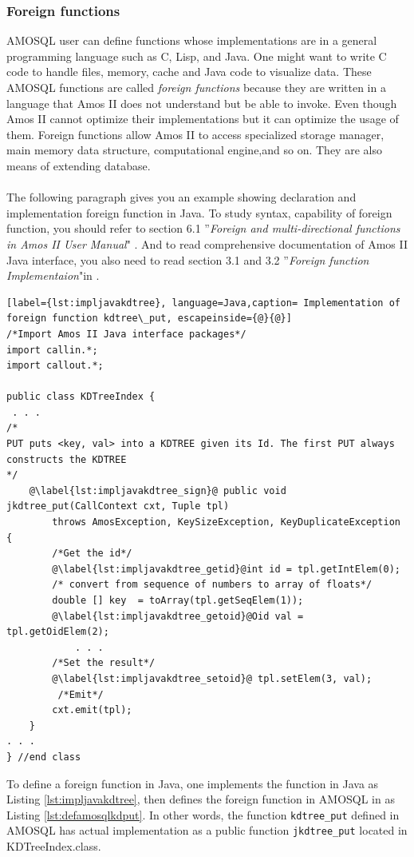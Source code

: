 \documentclass[12pt]{article}
\begin{document}
\subsubsection{Foreign functions}
AMOSQL user can define functions whose implementations are in a general programming language such as C, Lisp, and Java. One might want to write C code to handle files, memory, cache and Java code to visualize data. These AMOSQL functions are called \emph{foreign functions} because they are written in a language that Amos II does not understand but be able to invoke. Even though Amos II cannot optimize their implementations but it can optimize the usage of them. Foreign functions allow Amos II to access specialized storage manager, main memory data structure, computational engine,and so on. They are also means of extending database.\\\\
The following paragraph gives you an example showing declaration and implementation foreign function in Java. To study syntax, capability of foreign function, you should refer to section 6.1 ''\emph{Foreign and multi-directional functions in Amos II User Manual}" \cite{AmosII}. And to read comprehensive documentation of Amos II Java interface, you also need to read section 3.1 and 3.2 ''\emph{Foreign function Implementaion}"in \cite{AmosIIJava}.\\

\begin{lstlisting}[label={lst:impljavakdtree}, language=Java,caption= Implementation of foreign function kdtree\_put, escapeinside={@}{@}]
/*Import Amos II Java interface packages*/
import callin.*;
import callout.*;

public class KDTreeIndex {
 . . .
/*
PUT puts <key, val> into a KDTREE given its Id. The first PUT always constructs the KDTREE
*/
	@\label{lst:impljavakdtree_sign}@ public void jkdtree_put(CallContext cxt, Tuple tpl)
		throws AmosException, KeySizeException, KeyDuplicateException {
		/*Get the id*/
		@\label{lst:impljavakdtree_getid}@int id = tpl.getIntElem(0);
		/* convert from sequence of numbers to array of floats*/
		double [] key  = toArray(tpl.getSeqElem(1));
		@\label{lst:impljavakdtree_getoid}@Oid val =  tpl.getOidElem(2);
			. . .
		/*Set the result*/
		@\label{lst:impljavakdtree_setoid}@ tpl.setElem(3, val);
		 /*Emit*/
		cxt.emit(tpl);
	}
. . .
} //end class
\end{lstlisting}

To define a foreign function in Java, one implements the function in Java as Listing \ref{lst:impljavakdtree}, then defines the foreign function in AMOSQL in as Listing \ref{lst:defamosqlkdput}. In other words, the function \texttt{kdtree\_put} defined in AMOSQL has actual implementation as a public function \texttt{jkdtree\_put} located in KDTreeIndex.class.\\
\end{document}
